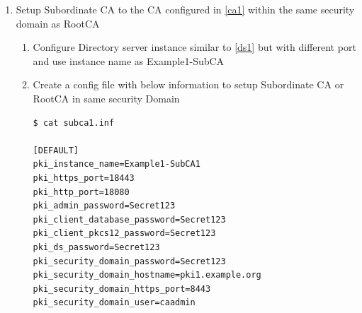 \documentclass[a4paper]{article}
\begin{document}
\begin{enumerate}[label*=\arabic*.]
\begin{enumerate}[label*=\arabic*.]
\begin{lstlisting}[style=bashInputStyle]
[slapd]
ServerIdentifier=Example1-RootCA
ServerPort=389
Suffix=dc=example,dc=org
RootDN=cn=Directory Manager
RootDNPwd=Secret123

[admin]
ServerAdminID=admin
ServerAdminPwd=Secret123
SysUser=nobody
                    \end{lstlisting}
                    \begin{lstlisting}[style=bashInputStyle]
$ setup-ds.pl --silent --file=ca-ds.inf --debug
                    \end{lstlisting}
                \item \label{ca1}Run \textbf{\textit{pkispawn}} in interactive mode use default ports and specify Directory
                    server information configured above. Use Tomcat Instance name as 'pki-tomcat'
                    \begin{lstlisting}
Subsystem (CA/KRA/OCSP/TKS/TPS) [CA]:

Tomcat:
  Instance [pki-tomcat]:
  HTTP port [8080]:
  Secure HTTP port [8443]:
  AJP port [8009]:
  Management port [8005]:

Administrator:
  Username [caadmin]:
  Password:
  Verify password:
  Import certificate (Yes/No) [N]?
  Export certificate to [/root/.dogtag/pki-tomcat/ca_admin.cert]:
Directory Server:
  Hostname [pki1.example.org]:
  Use a secure LDAPS connection (Yes/No/Quit) [N]?
  LDAP Port [389]:
  Bind DN [cn=Directory Manager]:
  Password:
  Base DN [o=pki-tomcat-CA]:

Security Domain:
  Name [example.org Security Domain]:

Begin installation (Yes/No/Quit)? Yes
                    \end{lstlisting}
            \end{enumerate}
        \item \label{ca2} Setup Subordinate CA to the CA configured in \ref{ca1} within the same security domain as RootCA
            \begin{enumerate}[label*=\arabic*.]
                \item Configure Directory server instance similar to \ref{ds1} but with different port and use instance name as Example1-SubCA
                \item Create a config file with below information to setup Subordinate CA or RootCA in same security Domain
                    \begin{lstlisting}
$ cat subca1.inf 

[DEFAULT]
pki_instance_name=Example1-SubCA1
pki_https_port=18443
pki_http_port=18080
pki_admin_password=Secret123
pki_client_database_password=Secret123
pki_client_pkcs12_password=Secret123
pki_ds_password=Secret123
pki_security_domain_password=Secret123
pki_security_domain_hostname=pki1.example.org
pki_security_domain_https_port=8443
pki_security_domain_user=caadmin


\end{lstlisting}
\end{enumerate}
\end{enumerate}
\end{document}
